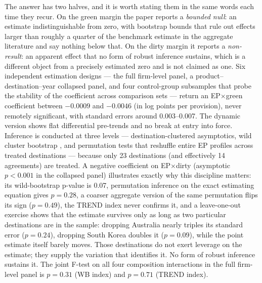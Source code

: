 \documentclass[12pt]{article}
\begin{document}
The answer has two halves, and it is worth stating them in the same words each time they
recur. On the green margin the paper reports a \emph{bounded null}: an estimate
indistinguishable from zero, with bootstrap bounds that rule out effects larger than
roughly a quarter of the benchmark estimate in the aggregate literature and say nothing
below that. On the dirty margin it reports a \emph{non-result}: an apparent effect that
no form of robust inference sustains, which is a different object from a precisely
estimated zero and is not claimed as one. Six independent estimation
designs --- the full firm-level panel, a product--destination--year collapsed panel, and
four control-group subsamples that probe the stability of the coefficient across
comparison sets --- return an EP$\times$green coefficient between $-0.0009$ and
$-0.0046$ (in log points per provision), never remotely significant, with standard errors
around 0.003--0.007. The dynamic version shows flat differential pre-trends and no break
at entry into force. Inference is conducted at three levels --- destination-clustered
asymptotics, wild cluster bootstrap \citep{cameron2008}, and permutation tests that
reshuffle entire EP profiles across treated destinations \citep{fisher1935,bertrand2004}
--- because only 23 destinations (and effectively 14 agreements) are treated. A
negative coefficient on EP$\times$dirty (asymptotic $p<0.001$ in the collapsed
panel) illustrates exactly why this discipline matters: its wild-bootstrap p-value is
0.07, permutation inference on the exact estimating equation gives $p=0.28$, a coarser
aggregate version of the same permutation flips its sign ($p=0.49$), the TREND index never
confirms it, and a leave-one-out exercise shows that the estimate survives only as long as
two particular destinations are in the sample: dropping Australia nearly triples its
standard error ($p=0.24$), dropping South Korea doubles it ($p=0.09$), while the point
estimate itself barely moves. Those destinations do not exert leverage on the estimate;
they supply the variation that identifies it. No form of robust
inference sustains it. The joint
F-test on all four composition interactions in the full firm-level panel is $p=0.31$ (WB
index) and $p=0.71$ (TREND index).
\end{document}
